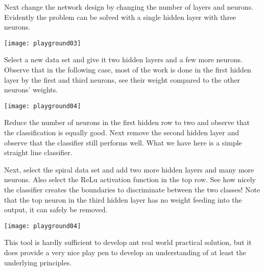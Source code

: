 Next change the network design by changing the number of layers and neurons. Evidently the problem can be solved with a single hidden layer with three neurons.

\begin{figure*}[h]
\texttt{[image: playground03]}
\end{figure*}

\FloatBarrier

Select a new data set and give it two hidden layers and a few more neurons. Observe that in the following case, most of the work is done in the first hidden layer by the first and third neurons, see their weight compared to the other neurons' weights.

\begin{figure*}[h]
\texttt{[image: playground04]}
\end{figure*}

\FloatBarrier

Reduce the number of neurons in the first hidden row to two and observe that the classification is equally good.  Next remove the second hidden layer and observe that the classifier still performs well. What we have here is a simple straight line classifier.

Next, select the spiral data set and add two more hidden layers and many more neurons.  Also select the ReLu activation function in the top row.  See how nicely the classifier creates the boundaries to discriminate between the two classes!  Note that the top neuron in the third hidden layer has no weight feeding into the output, it can safely be removed.

\begin{figure*}[h]
\texttt{[image: playground04]}
\end{figure*}

\FloatBarrier

This tool is hardly sufficient to develop ant real world practical solution, but it does provide a very nice play pen to develop an understanding of at least the underlying principles.
